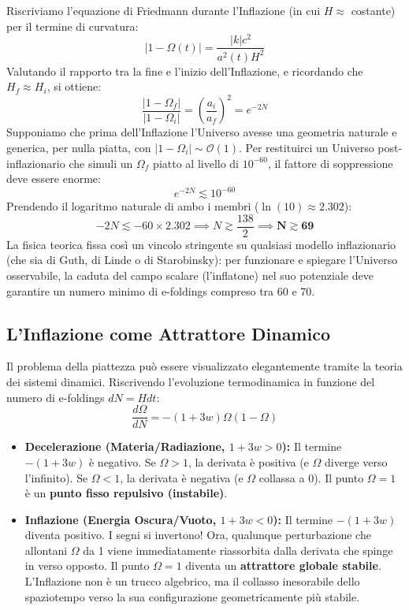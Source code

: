 \documentclass[11pt,a4paper]{report}
\begin{document}
Riscriviamo l'equazione di Friedmann durante l'Inflazione (in cui $H \approx$ costante) per il termine di curvatura:
\begin{equation}
|1 - \Omega(t)| = \frac{|k|c^2}{a^2(t) H^2}
\end{equation}
Valutando il rapporto tra la fine e l'inizio dell'Inflazione, e ricordando che $H_f \approx H_i$, si ottiene:
\begin{equation}
\frac{|1 - \Omega_f|}{|1 - \Omega_i|} = \left( \frac{a_i}{a_f} \right)^2 = e^{-2N}
\end{equation}
Supponiamo che prima dell'Inflazione l'Universo avesse una geometria naturale e generica, per nulla piatta, con $|1 - \Omega_i| \sim \mathcal{O}(1)$. Per restituirci un Universo post-inflazionario che simuli un $\Omega_f$ piatto al livello di $10^{-60}$, il fattore di soppressione deve essere enorme:
\begin{equation}
e^{-2N} \lesssim 10^{-60}
\end{equation}
Prendendo il logaritmo naturale di ambo i membri ($\ln(10) \approx 2.302$):
\begin{equation}
-2N \lesssim -60 \times 2.302 \implies N \gtrsim \frac{138}{2} \implies \mathbf{N \gtrsim 69}
\end{equation}
La fisica teorica fissa così un vincolo stringente su qualsiasi modello inflazionario (che sia di Guth, di Linde o di Starobinsky): per funzionare e spiegare l'Universo osservabile, la caduta del campo scalare (l'inflatone) nel suo potenziale deve garantire un numero minimo di e-foldings compreso tra 60 e 70.

\subsection{L'Inflazione come Attrattore Dinamico}
Il problema della piattezza può essere visualizzato elegantemente tramite la teoria dei sistemi dinamici. Riscrivendo l'evoluzione termodinamica in funzione del numero di e-foldings $dN = H dt$:
\begin{equation}
\frac{d\Omega}{dN} = -(1+3w)\Omega(1-\Omega)
\end{equation}
\begin{itemize}
    \item \textbf{Decelerazione (Materia/Radiazione, $1+3w > 0$):} Il termine $-(1+3w)$ è negativo. Se $\Omega > 1$, la derivata è positiva (e $\Omega$ diverge verso l'infinito). Se $\Omega < 1$, la derivata è negativa (e $\Omega$ collassa a 0). Il punto $\Omega = 1$ è un \textbf{punto fisso repulsivo (instabile)}.
    \item \textbf{Inflazione (Energia Oscura/Vuoto, $1+3w < 0$):} Il termine $-(1+3w)$ diventa positivo. I segni si invertono! Ora, qualunque perturbazione che allontani $\Omega$ da 1 viene immediatamente riassorbita dalla derivata che spinge in verso opposto. Il punto $\Omega = 1$ diventa un \textbf{attrattore globale stabile}. L'Inflazione non è un trucco algebrico, ma il collasso inesorabile dello spaziotempo verso la sua configurazione geometricamente più stabile.
\end{itemize}
\end{document}
